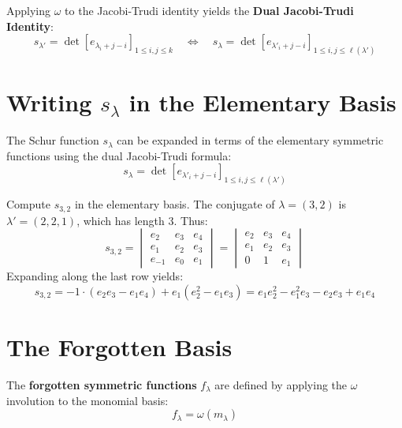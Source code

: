 \documentclass[12pt]{memoir}
\begin{document}
Applying $\omega$ to the Jacobi-Trudi identity yields the \textbf{Dual Jacobi-Trudi Identity}:
\[
s_{\lambda'} = \det \left[ e_{\lambda_i + j - i} \right]_{1 \le i, j \le k} \quad \Longleftrightarrow \quad s_\lambda = \det \left[ e_{\lambda'_i + j - i} \right]_{1 \le i, j \le \ell(\lambda')}
\]

\newpage

\section{Writing \texorpdfstring{$s_\lambda$}{s_{\lambda}} in the Elementary Basis}

\begin{ptcb}
\begin{Cor}
The Schur function $s_\lambda$ can be expanded in terms of the elementary symmetric functions using the dual Jacobi-Trudi formula:
\[
s_\lambda = \det \left[ e_{\lambda'_i + j - i} \right]_{1 \le i, j \le \ell(\lambda')}
\]
\end{Cor}
\end{ptcb}

\begin{ptcb}
\begin{Ex}
Compute $s_{3,2}$ in the elementary basis.
The conjugate of $\lambda = (3,2)$ is $\lambda' = (2,2,1)$, which has length $3$. Thus:
\[
s_{3,2} = \begin{vmatrix}
e_2 & e_3 & e_4 \\
e_1 & e_2 & e_3 \\
e_{-1} & e_0 & e_1
\end{vmatrix}
= \begin{vmatrix}
e_2 & e_3 & e_4 \\
e_1 & e_2 & e_3 \\
0 & 1 & e_1
\end{vmatrix}
\]
Expanding along the last row yields:
\[
s_{3,2} = -1 \cdot (e_2 e_3 - e_1 e_4) + e_1 (e_2^2 - e_1 e_3) = e_1 e_2^2 - e_1^2 e_3 - e_2 e_3 + e_1 e_4
\]
\end{Ex}
\end{ptcb}

\newpage

\section{The Forgotten Basis}

\begin{ptcb}
\begin{Def}
The \textbf{forgotten symmetric functions} $f_\lambda$ are defined by applying the $\omega$ involution to the monomial basis:
\[
f_\lambda = \omega(m_\lambda)
\]
\end{Def}
\end{ptcb}
\end{document}
